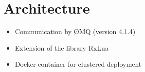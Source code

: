 \section{Architecture}
\label{sec:architecture}

\begin{itemize}
  \item Communication by ØMQ (version 4.1.4)
  \item Extension of the library RxLua
  \item Docker container for clustered deployment
\end{itemize}
